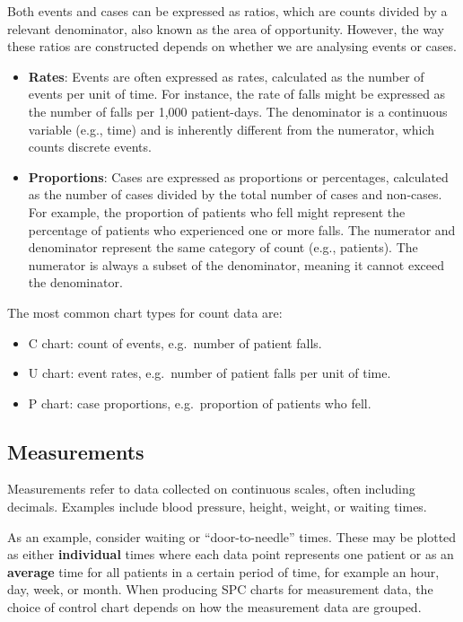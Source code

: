 \documentclass[
]{book}
\providecommand{\tightlist}{%
  \setlength{\itemsep}{0pt}\setlength{\parskip}{0pt}}
\begin{document}
Both events and cases can be expressed as ratios, which are counts divided by a relevant denominator, also known as the area of opportunity. However, the way these ratios are constructed depends on whether we are analysing events or cases.

\begin{itemize}
\item
  \textbf{Rates}: Events are often expressed as rates, calculated as the number of events per unit of time. For instance, the rate of falls might be expressed as the number of falls per 1,000 patient-days. The denominator is a continuous variable (e.g., time) and is inherently different from the numerator, which counts discrete events.
\item
  \textbf{Proportions}: Cases are expressed as proportions or percentages, calculated as the number of cases divided by the total number of cases and non-cases. For example, the proportion of patients who fell might represent the percentage of patients who experienced one or more falls. The numerator and denominator represent the same category of count (e.g., patients). The numerator is always a subset of the denominator, meaning it cannot exceed the denominator.
\end{itemize}

The most common chart types for count data are:

\begin{itemize}
\tightlist
\item
  C chart: count of events, e.g.~number of patient falls.
\item
  U chart: event rates, e.g.~number of patient falls per unit of time.
\item
  P chart: case proportions, e.g.~proportion of patients who fell.
\end{itemize}

\subsection{Measurements}\label{measurements}

Measurements refer to data collected on continuous scales, often including decimals. Examples include blood pressure, height, weight, or waiting times.

As an example, consider waiting or ``door-to-needle'' times. These may be plotted as either \textbf{individual} times where each data point represents one patient or as an \textbf{average} time for all patients in a certain period of time, for example an hour, day, week, or month. When producing SPC charts for measurement data, the choice of control chart depends on how the measurement data are grouped.
\end{document}
